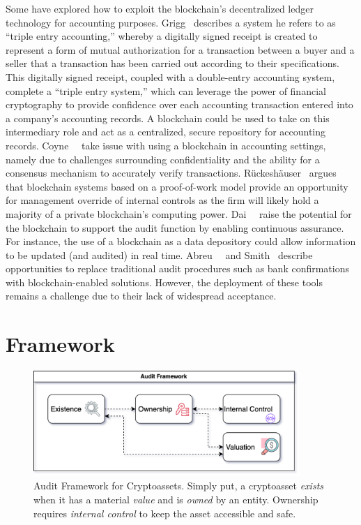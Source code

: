 Some have explored how to exploit the blockchain's decentralized ledger technology for accounting purposes. Grigg~\cite{grigg2005triple} describes a system he refers to as ``triple entry accounting,'' whereby a digitally signed receipt is created to represent a form of mutual authorization for a transaction between a buyer and a seller that a transaction has been carried out according to their specifications. This digitally signed receipt, coupled with a double-entry accounting system, complete a ``triple entry system,'' which can leverage the power of financial cryptography to provide confidence over each accounting transaction entered into a company's accounting records. A blockchain could be used to take on this intermediary role and act as a centralized, secure repository for accounting records. Coyne~\etal~\cite{coyne2017can} take issue with using a blockchain in accounting settings, namely due to challenges surrounding confidentiality and the ability for a consensus mechanism to accurately verify transactions. Rückeshäuser~\cite{ruckeshauser2017we} argues that blockchain systems based on a proof-of-work model provide an opportunity for management override of internal controls as the firm will likely hold a majority of a private blockchain's computing power. Dai~\etal~\cite{dai2017toward} raise the potential for the blockchain to support the audit function by enabling continuous assurance. For instance, the use of a blockchain as a data depository could allow information to be updated (and audited) in real time. Abreu~\etal~\cite{abreu2018blockchain} and Smith~\cite{cgma2018blockchain} describe opportunities to replace traditional audit procedures such as bank confirmations with blockchain-enabled solutions. However, the deployment of these tools remains a challenge due to their lack of widespread acceptance. 



\section{Framework} \label{sec:auditing:framework} 

\begin{figure}[t]\label{fig:audit_framework}
    \centering
    \includegraphics[width=0.9\textwidth]{figures/audit_framework.png}
    \caption[Audit Framework for Cryptoassets]{Audit Framework for Cryptoassets. Simply put, a cryptoasset \textit{exists} when it has a material \textit{value} and is \textit{owned} by an entity. Ownership requires \textit{internal control} to keep the asset accessible and safe.}
\end{figure}	

